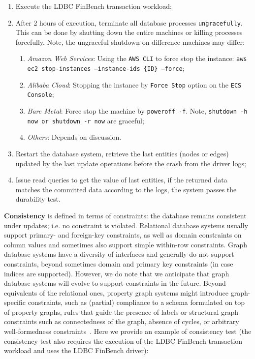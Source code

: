 \begin{enumerate}[label={(\roman*)}]
  \item Execute the LDBC FinBench transaction workload;
  \item After 2 hours of execution, terminate all database processes 
        \texttt{ungracefully}. This can be done by shutting down the entire 
        machines or killing processes forcefully. Note, the ungraceful shutdown
        on difference machines may differ:
        \begin{enumerate}[label={(\alph*)}]
          \item \emph{Amazon Web Services}: Using the \texttt{AWS CLI} to force 
                stop the instance: 
                \texttt{aws ec2 stop-instances --instance-ids \{ID\} --force};
          \item \emph{Alibaba Cloud}: Stopping the instance by \texttt{Force Stop}
                option on the \texttt{ECS Console};
          \item \emph{Bare Metal}: Force stop the machine by \texttt{poweroff -f}.
                Note, \texttt{shutdown -h now or shutdown -r now} are graceful;
          \item \emph{Others}: Depends on discussion.
        \end{enumerate}
  \item Restart the database system, retrieve the last entities (nodes or edges)
        updated by the last update operations before the crash from the driver 
        logs;
  \item Issue read queries to get the value of last entities, if the returned 
        data matches the committed data according to the logs, the system
        passes the durability test.
\end{enumerate}

{\bf Consistency} is defined in terms of constraints: the database remains 
consistent under updates; i.e. no constraint is violated. Relational database 
systems usually support primary- and foreign-key constraints, as well as domain 
constraints on column values and sometimes also support simple within-row 
constraints. Graph database systems have a diversity of interfaces and generally
do not support constraints, beyond sometimes domain and primary key constraints 
(in case indices are supported). However, we do note that we anticipate that 
graph database systems will evolve to support constraints in the future. Beyond 
equivalents of the relational ones, property graph systems might introduce 
graph-specific constraints, such as (partial) compliance to a schema formulated 
on top of property graphs, rules that guide the presence of labels or structural
graph constraints such as connectedness of the graph, absence of cycles, or 
arbitrary well-formedness constraints~\cite{DBLP:journals/sosym/SemerathBHSV17}.
Here we provide an example of consistency test (the consistency test also 
requires the execution of the LDBC FinBench transaction workload and uses the 
LDBC FinBench driver):

